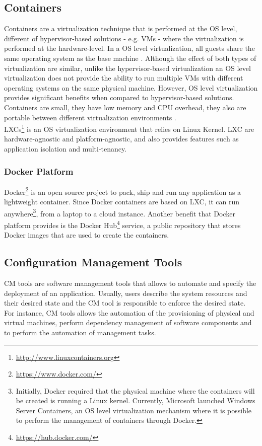 \subsection{Containers}
\label{sub:containers}
Containers are a virtualization technique that is performed at the \gls{OS} level, different of
hypervisor-based solutions - e.g. \glspl{VM} - where the virtualization is performed at the hardware-level.
In a \gls{OS} level virtualization, all guests share the same operating system as the base machine \cite{matthews2007quantifying}.
Although the effect of both types of virtualization are similar, unlike the hypervisor-based virtualization
an \gls{OS} level virtualization does not provide the ability to run multiple \glspl{VM} with different
operating systems on the same physical machine. However, \gls{OS} level virtualization provides significant
benefits when compared to hypervisor-based solutions. Containers are small, they have low memory and
\gls{CPU} overhead, they also are portable between different virtualization environments \cite{soltesz2007container}.\\

\glspl{LXC}\footnote{\url{http://www.linuxcontainers.org}} is an \gls{OS} virtualization environment that relies on Linux Kernel. \gls{LXC} are hardware-agnostic
and platform-agnostic, and also provides features such as application isolation and multi-tenancy.\\

\subsubsection{Docker Platform}
\label{subs:docker_platform}
Docker\footnote{\url{https://www.docker.com/}} is an open source project to pack, ship and run any application as
a lightweight container. Since Docker containers are based on \gls{LXC}, it can run anywhere\footnote{Initially, Docker required that the physical
machine where the containers will be created is running a Linux kernel. Currently, Microsoft
launched Windows Server Containers, an \gls{OS} level virtualization mechanism where it is possible to
perform the management of containers through Docker.}, from a laptop to a cloud instance. Another
benefit that Docker platform provides is the Docker Hub\footnote{\url{https://hub.docker.com/}} service,
a public repository that stores Docker images that are used to create the containers.

\subsection{Configuration Management Tools}
\label{sub:cm_tools}
\gls{CM} tools are software management tools that allows to automate and specify the deployment of an
application. Usually, users describe the system resources and their desired state and the \gls{CM}
tool is responsible to enforce the desired state. For instance, \gls{CM} tools allows the automation
of the provisioning of physical and virtual machines, perform dependency management of software
components and to perform the automation of management tasks.\\

